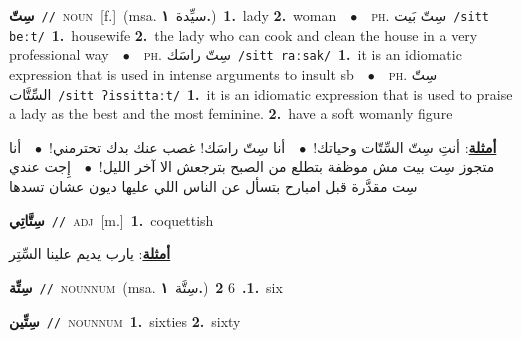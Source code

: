 \documentclass[10pt,a4paper,twoside]{article} %
\begin{document}
\begin{multicols}{2}
{\setlength\topsep{0pt}\textbf{\foreignlanguage{arabic}{سِتّ}}\ {\color{gray}\texttt{//}\color{black}}\ \textsc{noun}\ [f.]\ \color{gray}(msa. \foreignlanguage{arabic}{سيِّدة}~\foreignlanguage{arabic}{\textbf{١.}})\color{black}\ \textbf{1.}~lady  \textbf{2.}~woman\ \ $\bullet$\ \ \textsc{ph.} \color{gray} \foreignlanguage{arabic}{سِتّ بَيت}\color{black}\ {\color{gray}\texttt{/{\sffamily sitt beːt}/}\color{black}}\ \textbf{1.}~housewife  \textbf{2.}~the lady who can cook and clean the house in a very professional way\ \ $\bullet$\ \ \textsc{ph.} \color{gray} \foreignlanguage{arabic}{سِتّ راسَك}\color{black}\ {\color{gray}\texttt{/{\sffamily sitt raːsak}/}\color{black}}\ \textbf{1.}~it is an idiomatic expression that is used in intense arguments to insult sb\ \ $\bullet$\ \ \textsc{ph.} \color{gray} \foreignlanguage{arabic}{سِتّ السِّتَّات}\color{black}\ {\color{gray}\texttt{/{\sffamily sitt ʔissittaːt}/}\color{black}}\ \textbf{1.}~it is an idiomatic expression that is used to praise a lady as the best and the most feminine.  \textbf{2.}~have a soft womanly figure\  \begin{flushright}\color{gray}\foreignlanguage{arabic}{\textbf{\underline{\foreignlanguage{arabic}{أمثلة}}}: أنتِ سِتّ السِّتّات وحياتك!\ $\bullet$\ \  أنا سِتّ راسَك!  غصب عنك بدك تحترمني!\ $\bullet$\ \  أنا متجوز سِت بيت مش موظفة بتطلع من الصبح بترجعش الا آخر الليل!\ $\bullet$\ \  إِجت عندي سِت مقدَّرة قبل امبارح بتسأل عن الناس اللي عليها ديون عشان تسدها}\end{flushright}\color{black}} \vspace{2mm}

{\setlength\topsep{0pt}\textbf{\foreignlanguage{arabic}{سِتَّاتِي}}\ {\color{gray}\texttt{//}\color{black}}\ \textsc{adj}\ [m.]\ \textbf{1.}~coquettish\  \begin{flushright}\color{gray}\foreignlanguage{arabic}{\textbf{\underline{\foreignlanguage{arabic}{أمثلة}}}: يارب يديم علينا السِّتِر}\end{flushright}\color{black}} \vspace{2mm}

{\setlength\topsep{0pt}\textbf{\foreignlanguage{arabic}{سِتِّة}}\ {\color{gray}\texttt{//}\color{black}}\ \textsc{noun\textunderscore num}\ \color{gray}(msa. \foreignlanguage{arabic}{سِتَّة}~\foreignlanguage{arabic}{\textbf{١.}})\color{black}\ \textbf{1.}~6  \textbf{2.}~six\ } \vspace{2mm}

{\setlength\topsep{0pt}\textbf{\foreignlanguage{arabic}{سِتِّين}}\ {\color{gray}\texttt{//}\color{black}}\ \textsc{noun\textunderscore num}\ \textbf{1.}~sixties  \textbf{2.}~sixty\ } \vspace{2mm}


\end{multicols}
\end{document}
